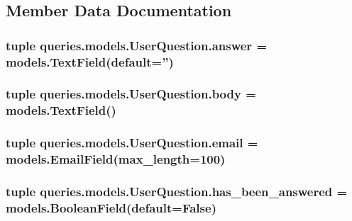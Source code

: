 \subsection{Member Data Documentation}
\hypertarget{classqueries_1_1models_1_1_user_question_a60bb4d98ce60f2b003a8aede96f10ed9}{
\subsubsection[{answer}]{\setlength{\rightskip}{0pt plus 5cm}tuple queries.\-models.\-User\-Question.\-answer = models.\-Text\-Field(default='')\hspace{0.3cm}{\ttfamily [static]}}}\label{classqueries_1_1models_1_1_user_question_a60bb4d98ce60f2b003a8aede96f10ed9}
\hypertarget{classqueries_1_1models_1_1_user_question_a82c29d9cf27cf5c3f5bea740c509177a}{
\subsubsection[{body}]{\setlength{\rightskip}{0pt plus 5cm}tuple queries.\-models.\-User\-Question.\-body = models.\-Text\-Field()\hspace{0.3cm}{\ttfamily [static]}}}\label{classqueries_1_1models_1_1_user_question_a82c29d9cf27cf5c3f5bea740c509177a}
\hypertarget{classqueries_1_1models_1_1_user_question_aa65cfbbd47d6b13efee75d428d370029}{
\subsubsection[{email}]{\setlength{\rightskip}{0pt plus 5cm}tuple queries.\-models.\-User\-Question.\-email = models.\-Email\-Field(max\-\_\-length=100)\hspace{0.3cm}{\ttfamily [static]}}}\label{classqueries_1_1models_1_1_user_question_aa65cfbbd47d6b13efee75d428d370029}
\hypertarget{classqueries_1_1models_1_1_user_question_a153e1ff87e262858b13ae88e4338448d}{
\subsubsection[{has\-\_\-been\-\_\-answered}]{\setlength{\rightskip}{0pt plus 5cm}tuple queries.\-models.\-User\-Question.\-has\-\_\-been\-\_\-answered = models.\-Boolean\-Field(default=False)\hspace{0.3cm}{\ttfamily [static]}}}\label{classqueries_1_1models_1_1_user_question_a153e1ff87e262858b13ae88e4338448d}
